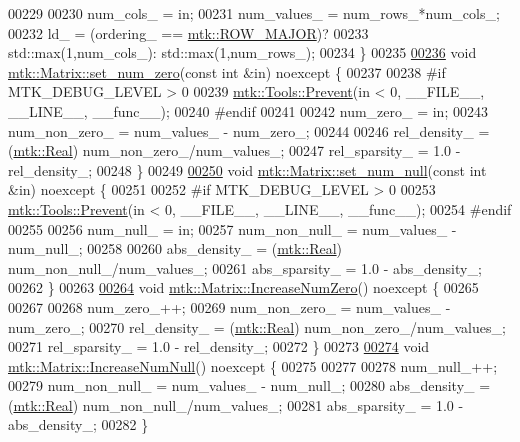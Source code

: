 \begin{DoxyCode}
00229 
00230   num\_cols\_ = in;
00231   num\_values\_ = num\_rows\_*num\_cols\_;
00232   ld\_ = (ordering\_ == \hyperlink{namespacemtk_ga622801bd9f912d0f976c3e383f5f581cabc55178ac16eb1ce89b5f3ab915a91f3}{mtk::ROW\_MAJOR})?
00233     std::max(1,num\_cols\_): std::max(1,num\_rows\_);
00234 \}
00235 
\hypertarget{mtk__matrix_8cc_source_l00236}{}\hyperlink{classmtk_1_1Matrix_a6eb14709692df59573548ffd8cf67198}{00236} \textcolor{keywordtype}{void} \hyperlink{classmtk_1_1Matrix_a6eb14709692df59573548ffd8cf67198}{mtk::Matrix::set\_num\_zero}(\textcolor{keyword}{const} \textcolor{keywordtype}{int} &in) noexcept \{
00237 
00238 \textcolor{preprocessor}{  #if MTK\_DEBUG\_LEVEL > 0}
00239   \hyperlink{classmtk_1_1Tools_a332324c6f25e66be9dff48c5987a3b9f}{mtk::Tools::Prevent}(in < 0, \_\_FILE\_\_, \_\_LINE\_\_, \_\_func\_\_);
00240 \textcolor{preprocessor}{  #endif}
00241 
00242   num\_zero\_ = in;
00243   num\_non\_zero\_ = num\_values\_ - num\_zero\_;
00244 
00246   rel\_density\_ = (\hyperlink{group__c01-roots_gac080bbbf5cbb5502c9f00405f894857d}{mtk::Real}) num\_non\_zero\_/num\_values\_;
00247   rel\_sparsity\_ = 1.0 - rel\_density\_;
00248 \}
00249 
\hypertarget{mtk__matrix_8cc_source_l00250}{}\hyperlink{classmtk_1_1Matrix_a61dba12c767f98cda5343b4b16bbbe77}{00250} \textcolor{keywordtype}{void} \hyperlink{classmtk_1_1Matrix_a61dba12c767f98cda5343b4b16bbbe77}{mtk::Matrix::set\_num\_null}(\textcolor{keyword}{const} \textcolor{keywordtype}{int} &in) noexcept \{
00251 
00252 \textcolor{preprocessor}{  #if MTK\_DEBUG\_LEVEL > 0}
00253   \hyperlink{classmtk_1_1Tools_a332324c6f25e66be9dff48c5987a3b9f}{mtk::Tools::Prevent}(in < 0, \_\_FILE\_\_, \_\_LINE\_\_, \_\_func\_\_);
00254 \textcolor{preprocessor}{  #endif}
00255 
00256   num\_null\_ = in;
00257   num\_non\_null\_ = num\_values\_ - num\_null\_;
00258 
00260   abs\_density\_ = (\hyperlink{group__c01-roots_gac080bbbf5cbb5502c9f00405f894857d}{mtk::Real}) num\_non\_null\_/num\_values\_;
00261   abs\_sparsity\_ = 1.0 - abs\_density\_;
00262 \}
00263 
\hypertarget{mtk__matrix_8cc_source_l00264}{}\hyperlink{classmtk_1_1Matrix_ace7cb5c31d0de66b8f9c63cd542c9e63}{00264} \textcolor{keywordtype}{void} \hyperlink{classmtk_1_1Matrix_ace7cb5c31d0de66b8f9c63cd542c9e63}{mtk::Matrix::IncreaseNumZero}() noexcept \{
00265 
00267 
00268   num\_zero\_++;
00269   num\_non\_zero\_ = num\_values\_ - num\_zero\_;
00270   rel\_density\_ = (\hyperlink{group__c01-roots_gac080bbbf5cbb5502c9f00405f894857d}{mtk::Real}) num\_non\_zero\_/num\_values\_;
00271   rel\_sparsity\_ = 1.0 - rel\_density\_;
00272 \}
00273 
\hypertarget{mtk__matrix_8cc_source_l00274}{}\hyperlink{classmtk_1_1Matrix_af4bba5c43d1f09f5059a04298ba24568}{00274} \textcolor{keywordtype}{void} \hyperlink{classmtk_1_1Matrix_af4bba5c43d1f09f5059a04298ba24568}{mtk::Matrix::IncreaseNumNull}() noexcept \{
00275 
00277 
00278   num\_null\_++;
00279   num\_non\_null\_ = num\_values\_ - num\_null\_;
00280   abs\_density\_ = (\hyperlink{group__c01-roots_gac080bbbf5cbb5502c9f00405f894857d}{mtk::Real}) num\_non\_null\_/num\_values\_;
00281   abs\_sparsity\_ = 1.0 - abs\_density\_;
00282 \}
\end{DoxyCode}

